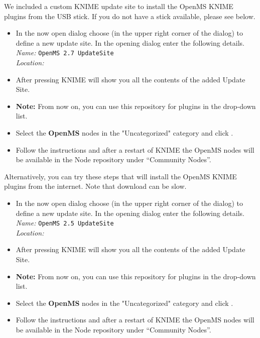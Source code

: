 We included a custom KNIME update site to install the OpenMS KNIME plugins from the USB stick. If you do not have a stick available, please see below.

\begin{itemize}
  \item \label{it:add_site} In the now open dialog choose  (in the upper right corner of the dialog) to define a new update site. In the opening dialog enter the following details. \\
  \textit{Name:} \texttt{OpenMS 2.7 UpdateSite} \\
  \textit{Location:}  \KnimeUSBUpdateSite \\
  \item \label{it:select_site} After pressing  KNIME will show you all the contents of the added Update Site.
  \item \textbf{Note:} From now on, you can use this repository for plugins in the  drop-down list.
  \item Select the \textbf{OpenMS} nodes in the "Uncategorized" category and click .
  \item Follow the instructions and after a restart of KNIME the OpenMS nodes will be available in the Node repository under “Community Nodes”.
\end{itemize}

Alternatively, you can try these steps that will install the OpenMS KNIME plugins from the internet. Note that download can be slow.

\begin{itemize}
  \item \label{it:add_site} In the now open dialog choose  (in the upper right corner of the dialog) to define a new update site. In the opening dialog enter the following details. \\
  \textit{Name:} \texttt{OpenMS 2.5 UpdateSite} \\
  \textit{Location:} 
\end{itemize}  
  \menu{\KnimeTrunkSite}
\begin{itemize}
  \item \label{it:select_site} After pressing  KNIME will show you all the contents of the added Update Site.
  \item \textbf{Note:} From now on, you can use this repository for plugins in the  drop-down list.
  \item Select the \textbf{OpenMS} nodes in the "Uncategorized" category and click .
  \item Follow the instructions and after a restart of KNIME the OpenMS nodes will be available in the Node repository under “Community Nodes”.
\end{itemize}

